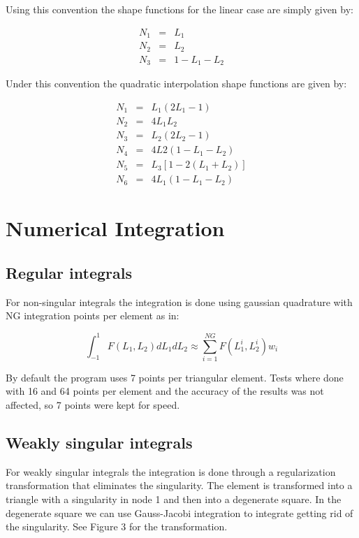 \documentclass[12pt]{article}
\begin{document}
Using this convention the shape functions for the linear case are simply given by:

\begin{eqnarray}
N_1 & = & L_1 \\
N_2 & = & L_2 \\
N_3 & = & 1-L_1-L_2
\end{eqnarray}

Under this convention the quadratic interpolation shape functions are given by:

\begin{eqnarray}
N_1 & = & L_1(2L_1-1) \\
N_2 & = & 4L_1L_2 \\
N_3 & = & L_2(2L_2-1) \\
N_4 & = & 4L2(1-L_1-L_2) \\
N_5 & = & L_3[1-2(L_1+L_2)] \\
N_6 & = & 4L_1(1-L_1-L_2)\end{eqnarray}

\pagebreak
\section{Numerical Integration}

\subsection*{Regular integrals}
For non-singular integrals the integration is done using gaussian quadrature with NG integration points per element as in:

\begin{equation}
\int_{-1}^1{F(L_1,L_2)dL_1dL_2} \approx \sum_{i=1}^{NG}{F(L_1^i,L_2^i)w_i}
\end{equation}

By default the program uses 7 points per triangular element. Tests where done with 16 and 64 points per element and the accuracy of the results was not affected, so 7 points were kept for speed.

\subsection*{Weakly singular integrals}
For weakly singular integrals the integration is done through a regularization transformation that eliminates the singularity. The element is transformed into a triangle with a singularity in node 1 and then into a degenerate square. In the degenerate square we can use Gauss-Jacobi integration to integrate getting rid of the singularity. See Figure 3 for the transformation.
\end{document}
